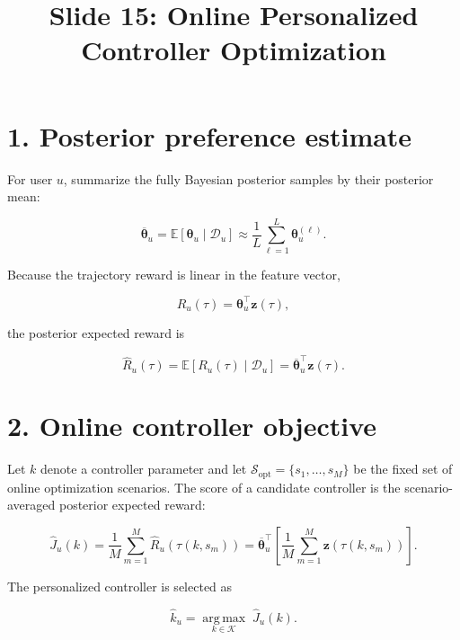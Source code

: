 \documentclass[11pt]{article}
\title{Slide 15: Online Personalized Controller Optimization}
\author{}
\date{}
\begin{document}
\maketitle

\section*{1. Posterior preference estimate}

For user $u$, summarize the fully Bayesian posterior samples by their posterior mean:

\begin{equation}
\overline{\boldsymbol{\theta}}_u
= \mathbb{E}\!\left[\boldsymbol{\theta}_u \mid \mathcal{D}_u\right]
\approx \frac{1}{L}\sum_{\ell=1}^{L}\boldsymbol{\theta}_u^{(\ell)}.
\end{equation}

Because the trajectory reward is linear in the feature vector,

\begin{equation}
R_u(\tau)=\boldsymbol{\theta}_u^{\top}\boldsymbol{z}(\tau),
\end{equation}

the posterior expected reward is

\begin{equation}
\widehat{R}_u(\tau)
= \mathbb{E}\!\left[R_u(\tau)\mid\mathcal{D}_u\right]
= \overline{\boldsymbol{\theta}}_u^{\top}\boldsymbol{z}(\tau).
\end{equation}

\section*{2. Online controller objective}

Let $k$ denote a controller parameter and let
$\mathcal{S}_{\mathrm{opt}}=\{s_1,\ldots,s_M\}$ be the fixed set of online optimization scenarios.
The score of a candidate controller is the scenario-averaged posterior expected reward:

\begin{equation}
\widehat{J}_u(k)
= \frac{1}{M}\sum_{m=1}^{M}
\widehat{R}_u\!\left(\tau(k,s_m)\right)
= \overline{\boldsymbol{\theta}}_u^{\top}
\left[
\frac{1}{M}\sum_{m=1}^{M}
\boldsymbol{z}\!\left(\tau(k,s_m)\right)
\right].
\end{equation}

The personalized controller is selected as

\begin{equation}
\widehat{k}_u
= \underset{k\in\mathcal{K}}{\operatorname{arg\,max}}
\;\widehat{J}_u(k).
\end{equation}
\end{document}
